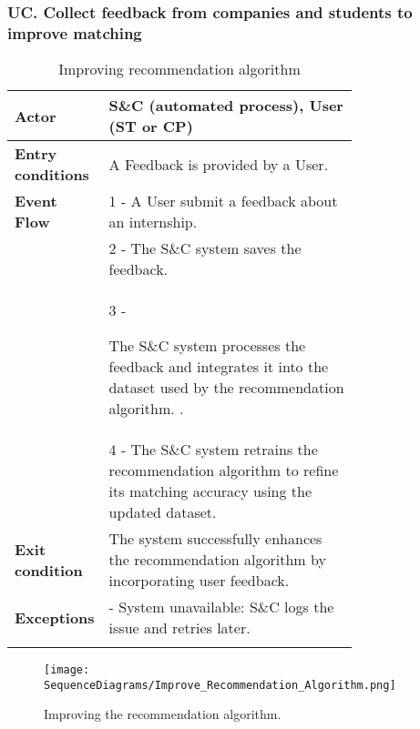 \subsubsection*{UC\cuc . Collect feedback from companies and students to improve matching}
\begin{center}
    \begin{longtable}{|l|p{0.75\linewidth}|}
        \hline
        \textbf{Actor}            & S\&C (automated process), User (ST or CP) \\
        \hline
        \textbf{Entry conditions} & A Feedback is provided by a User. \\
        \hline
        \textbf{Event Flow}       & 1 - A User submit a feedback about an internship. \\
        & 2 - The S\&C system saves the feedback. \\
        & 3 - 
    \item The S\&C system processes the feedback and integrates it into the dataset used by the recommendation algorithm. . \\
        & 4 - The S\&C system retrains the recommendation algorithm to refine its matching accuracy using the updated dataset. \\
        \hline
        \textbf{Exit condition}   & The system successfully enhances the recommendation algorithm by incorporating user feedback. \\       
        \hline
        \textbf{Exceptions}       & - System unavailable: S\&C logs the issue and retries later. \\
        \hline
        \caption{Improving recommendation algorithm}
        \label{tab:Improve_recommendation_algorithm_usecase}
    \end{longtable}
\end{center}

\begin{figure}[H]
    \begin{center}
        \texttt{[image: SequenceDiagrams/Improve\_Recommendation\_Algorithm.png]}
        \caption{Improving the recommendation algorithm.}
        \label{fig:improve_recommendation_algorithm_seqd}%
    \end{center}
\end{figure}


